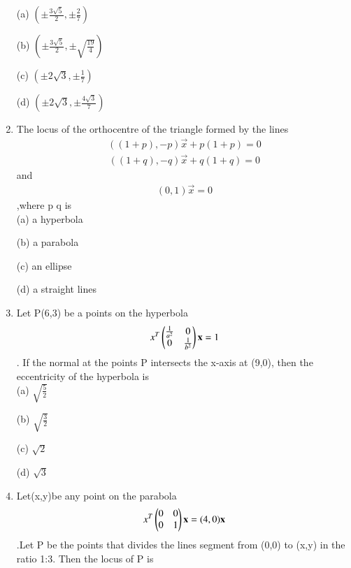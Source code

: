 \documentclass[journal,12pt,twocolumn]{IEEEtran}
\begin{document}
\begin{enumerate}
\choice (a) $(\pm{\frac{3\sqrt{5}}{2}}, \pm{\frac{2}{7}})$

\choice (b) $(\pm{\frac{3\sqrt{5}}{2}}, \pm{\sqrt{\frac{19}{4}}})$

\choice (c) $(\pm 2\sqrt{3}, \pm{\frac{1}{7}})$

\choice (d) $(\pm 2\sqrt{3}, \pm{\frac{4\sqrt{3}}{7}})$\\

\item The locus of the orthocentre of the triangle formed by the lines \begin{align}((1+p),-p)\vec x+p(1+p)=0\end{align} \begin{align}((1+q),-q)\vec x+q(1+q)=0\end{align}and \begin{align}(0,1)\vec x=0\end{align},where p \neq q is \\

\choice (a) a hyperbola

\choice (b) a parabola

\choice (c) an ellipse

\choice (d) a straight lines\\

\item Let P(6,3) be a points on the hyperbola \begin{align} x^T\begin{pmatrix}\frac{1}{a^2}&0\\0&\frac{1}{b^2}\end{pmatrix} \mathbf x =1\end{align}. If the normal at the points P intersects the x-axis at (9,0), then the eccentricity of the hyperbola is\\ 

\choice (a) $\sqrt{\frac{5}{2}}$

\choice (b) $\sqrt{\frac{3}{2}}$

\choice (c) $\sqrt{2}$

\choice (d)  $\sqrt{3}$\\

\item Let(x,y)be any point on the parabola \begin{align} x^T \begin{pmatrix}0 & 0 \\0 & 1\end{pmatrix}\mathbf x=(4,0)\mathbf x \end{align}.Let P be the points that divides the lines segment from (0,0) to (x,y) in the ratio 1:3. Then the locus of P is \\
    

\end{enumerate}
\end{document}
